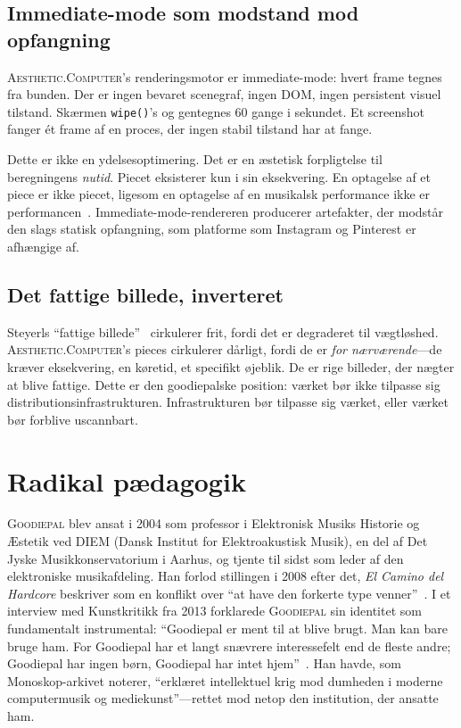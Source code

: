 \documentclass[10pt,letterpaper,twocolumn]{article}
\newcommand{\ac}{\textsc{Aesthetic.Computer}}
\newcommand{\gp}{\textsc{Goodiepal}}
\begin{document}
\subsection{Immediate-mode som modstand mod opfangning}

\ac{}'s renderingsmotor er immediate-mode: hvert frame tegnes fra bunden. Der er ingen bevaret scenegraf, ingen DOM, ingen persistent visuel tilstand. Skærmen \texttt{wipe()}'s og gentegnes 60 gange i sekundet. Et screenshot fanger ét frame af en proces, der ingen stabil tilstand har at fange.

Dette er ikke en ydelsesoptimering. Det er en æstetisk forpligtelse til beregningens \emph{nutid}. Piecet eksisterer kun i sin eksekvering. En optagelse af et piece er ikke piecet, ligesom en optagelse af en musikalsk performance ikke er performancen~\citep{magnusson2010designing}. Immediate-mode-rendereren producerer artefakter, der modstår den slags statisk opfangning, som platforme som Instagram og Pinterest er afhængige af.

\subsection{Det fattige billede, inverteret}

Steyerls ``fattige billede''~\citep{steyerl2009defense} cirkulerer frit, fordi det er degraderet til vægtløshed. \ac{}'s pieces cirkulerer dårligt, fordi de er \emph{for nærværende}---de kræver eksekvering, en køretid, et specifikt øjeblik. De er rige billeder, der nægter at blive fattige. Dette er den goodiepalske position: værket bør ikke tilpasse sig distributionsinfrastrukturen. Infrastrukturen bør tilpasse sig værket, eller værket bør forblive uscannbart.

\section{Radikal pædagogik}

\gp{} blev ansat i 2004 som professor i Elektronisk Musiks Historie og Æstetik ved DIEM (Dansk Institut for Elektroakustisk Musik), en del af Det Jyske Musikkonservatorium i Aarhus, og tjente til sidst som leder af den elektroniske musikafdeling. Han forlod stillingen i 2008 efter det, \emph{El Camino del Hardcore} beskriver som en konflikt over ``at have den forkerte type venner''~\citep{goodiepal2012elcamino}. I et interview med Kunstkritikk fra 2013 forklarede \gp{} sin identitet som fundamentalt instrumental: ``Goodiepal er ment til at blive brugt. Man kan bare bruge ham. For Goodiepal har et langt snævrere interessefelt end de fleste andre; Goodiepal har ingen børn, Goodiepal har intet hjem''~\citep{kunstkritikk2013goodiepal}. Han havde, som Monoskop-arkivet noterer, ``erklæret intellektuel krig mod dumheden i moderne computermusik og mediekunst''---rettet mod netop den institution, der ansatte ham.
\end{document}
